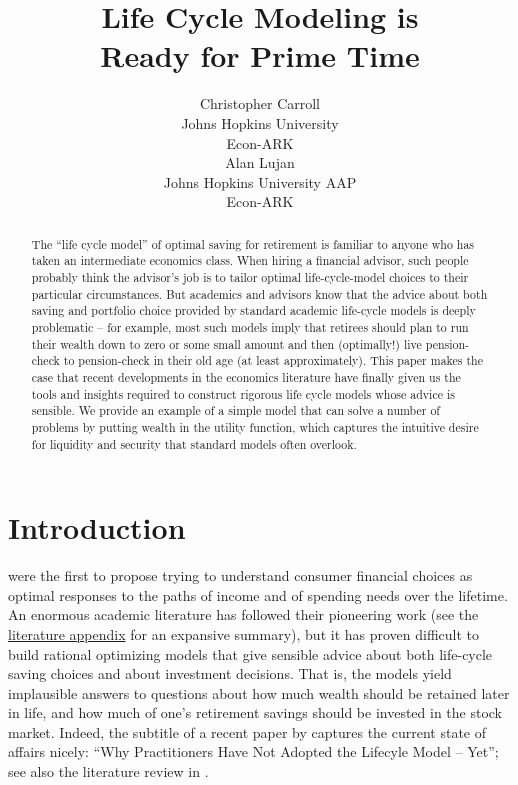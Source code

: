 \documentclass{article}
\title{Life Cycle Modeling is \\ Ready for Prime Time}
\date{\displaydate{articleDate}}
\author{Christopher Carroll\footnotemark[1]\\
Johns Hopkins University\\Econ-ARK\\\AND
Alan Lujan\\
Johns Hopkins University AAP\\Econ-ARK\\}
\begin{document}
\maketitle
{}

\begin{abstract}
The ``life cycle model'' of optimal saving for retirement is familiar to anyone who has taken an intermediate economics class.
When hiring a financial advisor, such people probably think the advisor's job is to tailor optimal life-cycle-model choices to their particular circumstances.
But academics and advisors know that the advice about both saving and portfolio choice provided by standard academic life-cycle models is deeply problematic -- for example, most such models imply that retirees should plan to run their wealth down to zero or some small amount and then (optimally!) live pension-check to pension-check in their old age (at least approximately).
This paper makes the case that recent developments in the economics literature have finally given us the tools and insights required to construct rigorous life cycle models whose advice is sensible.
We provide an example of a simple model that can solve a number of problems by putting wealth in the utility function, which captures the intuitive desire for liquidity and security that standard models often overlook.
\end{abstract}

\keywords{}

\section{Introduction}

\cite{modigliani1954} were the first to propose trying to understand consumer financial choices as optimal responses to the paths of income and of spending needs over the lifetime.
An enormous academic literature has followed their pioneering work (see the \href{/lit-review}{literature appendix} for an expansive summary),
but it has proven difficult to build rational optimizing models that give sensible advice about both life-cycle saving choices and about investment decisions.
That is, the models yield implausible answers to questions about how much wealth should be retained later in life, and how much of one's retirement savings should be invested in the stock market.
Indeed, the subtitle of a recent paper by \cite{Daga_2023} captures the current state of affairs nicely: ``Why Practitioners Have Not Adopted the Lifecyle Model -- Yet''; see also the literature review in \cite{DeNardi2016d}.
\end{document}
